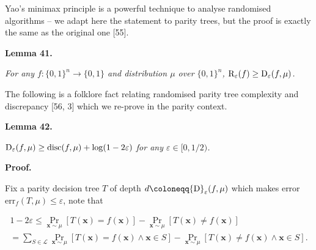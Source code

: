 \documentclass[10pt,a4paper]{article}
\begin{document}
Yao’s minimax principle is a powerful technique to analyse randomised algorithms – we adapt here the statement to parity trees, but the proof is exactly the same as the original one [55].\par





\par\medskip\noindent\textbf{
\textbf{Lemma 41}\textbf{.}
}\par



\emph{For any $f\colon\{0,1\}^{n}\to\{0,1\}$ and distribution $\mu$ over $\{0,1\}^{n}$, ${\textup{R}}_{\varepsilon}(f)\geq{\textup{D}}_{\varepsilon}(f,\mu)$.}\par






The following is a folklore fact relating randomised parity tree complexity and discrepancy [56, 3] which we re-prove in the parity context.\par





\par\medskip\noindent\textbf{
\textbf{Lemma 42}\textbf{.}
}\par



${\textup{D}}_{\varepsilon}(f,\mu)\geq{\textup{disc}}(f,\mu)+\log(1-2\varepsilon)$\emph{ for any $\varepsilon\in[0,1/2)$.}\par






\par\medskip\noindent\textbf{Proof.}\par




Fix a parity decision tree $T$ of depth $d\coloneqq{\textup{D}}_{\varepsilon}(f,\mu)$ which makes error $\mathrm{err}_{f}(T,\mu)\leq\varepsilon$, note that\par


\[\begin{gathered}
\displaystyle 1-2\varepsilon \displaystyle\leq\Pr_{\bm{x}\sim\mu}[T(\bm{x})=f(\bm{x})]-\Pr_{\bm{x}\sim\mu}[T(\bm{x})\neq f(\bm{x})] \\
\displaystyle=\sum\nolimits_{S\in\mathcal{L}}\Pr_{\bm{x}\sim\mu}[T(\bm{x})=f(\bm{x})\wedge\bm{x}\in S]-\Pr_{\bm{x}\sim\mu}[T(\bm{x})\neq f(\bm{x})\wedge\bm{x}\in S].
\end{gathered}\]
\end{document}
